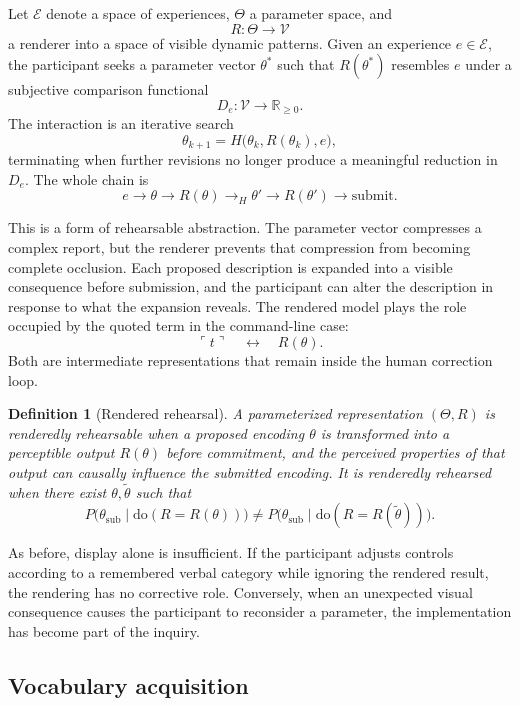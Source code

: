 \documentclass[11pt]{article}
\newtheorem{definition}{Definition}
\theoremstyle{remark}
\newcommand{\ql}{\ulcorner}
\newcommand{\qr}{\urcorner}
\newcommand{\quo}[1]{\ql #1\qr}
\begin{document}
Let $\mathcal{E}$ denote a space of experiences, $\Theta$ a parameter space, and
\[
R:\Theta\longrightarrow\mathcal{V}
\]
a renderer into a space of visible dynamic patterns. Given an experience $e\in\mathcal{E}$, the participant seeks a parameter vector $\theta^\ast$ such that $R(\theta^\ast)$ resembles $e$ under a subjective comparison functional
\[
D_e:\mathcal{V}\longrightarrow\mathbb{R}_{\geq 0}.
\]
The interaction is an iterative search
\[
\theta_{k+1}=H\bigl(\theta_k,R(\theta_k),e\bigr),
\]
terminating when further revisions no longer produce a meaningful reduction in $D_e$. The whole chain is
\[
e
\longrightarrow
\theta
\longrightarrow
R(\theta)
\longrightarrow_H
\theta'
\longrightarrow
R(\theta')
\longrightarrow
\text{submit}.
\]

This is a form of rehearsable abstraction. The parameter vector compresses a complex report, but the renderer prevents that compression from becoming complete occlusion. Each proposed description is expanded into a visible consequence before submission, and the participant can alter the description in response to what the expansion reveals. The rendered model plays the role occupied by the quoted term in the command-line case:
\[
\quo{t}
\quad\longleftrightarrow\quad
R(\theta).
\]
Both are intermediate representations that remain inside the human correction loop.

\begin{definition}[Rendered rehearsal]
A parameterized representation $(\Theta,R)$ is \emph{renderedly rehearsable} when a proposed encoding $\theta$ is transformed into a perceptible output $R(\theta)$ before commitment, and the perceived properties of that output can causally influence the submitted encoding. It is \emph{renderedly rehearsed} when there exist $\theta,\tilde\theta$ such that
\[
P\bigl(\theta_{\mathrm{sub}}\mid\mathrm{do}(R=R(\theta))\bigr)
\neq
P\bigl(\theta_{\mathrm{sub}}\mid\mathrm{do}(R=R(\tilde\theta))\bigr).
\]
\end{definition}

As before, display alone is insufficient. If the participant adjusts controls according to a remembered verbal category while ignoring the rendered result, the rendering has no corrective role. Conversely, when an unexpected visual consequence causes the participant to reconsider a parameter, the implementation has become part of the inquiry.

\subsection{Vocabulary acquisition}
\end{document}
